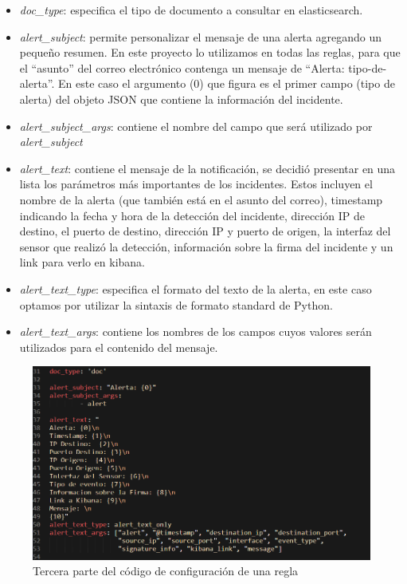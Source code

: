     \begin{itemize}
        \item \textit{doc\_type}: especifica el tipo de documento a consultar en elasticsearch.
        \item \textit{alert\_subject}: permite personalizar el mensaje de una alerta agregando un pequeño resumen. En este proyecto lo utilizamos en todas las reglas, para que el “asunto” del correo electrónico contenga un mensaje de “Alerta: tipo-de-alerta”. En este caso el argumento ({0}) que figura es el primer campo (tipo de alerta) del objeto JSON que contiene la información del incidente.
        \item \textit{alert\_subject\_args}: contiene el nombre del campo que será utilizado por \textit{alert\_subject}
        \item \textit{alert\_text}: contiene el mensaje de la notificación, se decidió presentar en una lista los parámetros más importantes de los incidentes. Estos incluyen el nombre de la alerta (que también está en el asunto del correo), timestamp indicando la fecha y hora de la detección del incidente, dirección IP de destino, el puerto de destino, dirección IP y puerto de origen, la interfaz del sensor que realizó la detección, información sobre la firma del incidente y un link para verlo en kibana.
        \item \textit{alert\_text\_type}: especifica el formato del texto de la alerta, en este caso optamos por utilizar la sintaxis de formato standard de Python.
        \item \textit{alert\_text\_args}: contiene los nombres de los campos cuyos valores serán utilizados para el contenido del mensaje.
    \end{itemize}
    \begin{figure}[H]
    \centering
        \includegraphics[width=1\textwidth]{./iteracion_2_imagenes/5-codigoAlerta3.png}
        \caption{Tercera parte del código de configuración de una regla}
        \label{fig:iter2_3_codigo}
    \end{figure}
